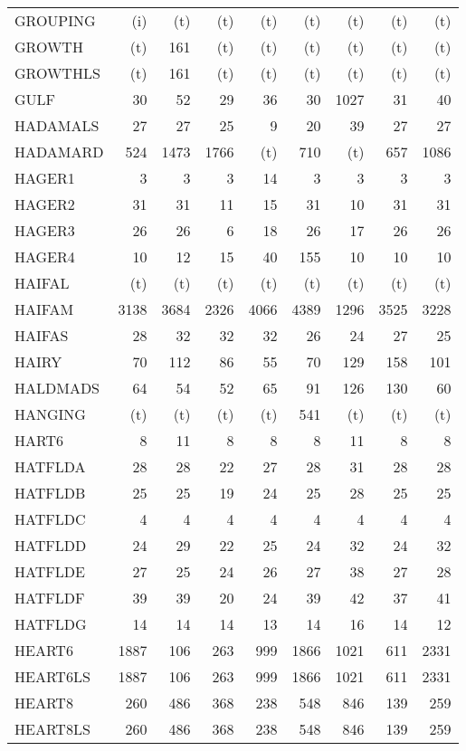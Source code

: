 \documentclass[11pt,twoside]{article}
\begin{document}
{\begin{longtable}[c]{|l|r|r|r|r|r|r|r|r|}
 GROUPING & (i) & (t) & (t) & (t) & (t) & (t) & (t) & (t) \\
 GROWTH & (t) & 161 & (t) & (t) & (t) & (t) & (t) & (t) \\
 GROWTHLS & (t) & 161 & (t) & (t) & (t) & (t) & (t) & (t) \\
 GULF & 30 & 52 & 29 & 36 & 30 & 1027 & 31 & 40 \\
 HADAMALS & 27 & 27 & 25 & 9 & 20 & 39 & 27 & 27 \\
 HADAMARD & 524 & 1473 & 1766 & (t) & 710 & (t) & 657 & 1086 \\
 HAGER1 & 3 & 3 & 3 & 14 & 3 & 3 & 3 & 3 \\
 HAGER2 & 31 & 31 & 11 & 15 & 31 & 10 & 31 & 31 \\
 HAGER3 & 26 & 26 & 6 & 18 & 26 & 17 & 26 & 26 \\
 HAGER4 & 10 & 12 & 15 & 40 & 155 & 10 & 10 & 10 \\
 HAIFAL & (t) & (t) & (t) & (t) & (t) & (t) & (t) & (t) \\
 HAIFAM & 3138 & 3684 & 2326 & 4066 & 4389 & 1296 & 3525 & 3228 \\
 HAIFAS & 28 & 32 & 32 & 32 & 26 & 24 & 27 & 25 \\
 HAIRY & 70 & 112 & 86 & 55 & 70 & 129 & 158 & 101 \\
 HALDMADS & 64 & 54 & 52 & 65 & 91 & 126 & 130 & 60 \\
 HANGING & (t) & (t) & (t) & (t) & 541 & (t) & (t) & (t) \\
 HART6 & 8 & 11 & 8 & 8 & 8 & 11 & 8 & 8 \\
 HATFLDA & 28 & 28 & 22 & 27 & 28 & 31 & 28 & 28 \\
 HATFLDB & 25 & 25 & 19 & 24 & 25 & 28 & 25 & 25 \\
 HATFLDC & 4 & 4 & 4 & 4 & 4 & 4 & 4 & 4 \\
 HATFLDD & 24 & 29 & 22 & 25 & 24 & 32 & 24 & 32 \\
 HATFLDE & 27 & 25 & 24 & 26 & 27 & 38 & 27 & 28 \\
 HATFLDF & 39 & 39 & 20 & 24 & 39 & 42 & 37 & 41 \\
 HATFLDG & 14 & 14 & 14 & 13 & 14 & 16 & 14 & 12 \\
 HEART6 & 1887 & 106 & 263 & 999 & 1866 & 1021 & 611 & 2331 \\
 HEART6LS & 1887 & 106 & 263 & 999 & 1866 & 1021 & 611 & 2331 \\
 HEART8 & 260 & 486 & 368 & 238 & 548 & 846 & 139 & 259 \\
 HEART8LS & 260 & 486 & 368 & 238 & 548 & 846 & 139 & 259 \\

\end{longtable}}
\end{document}
